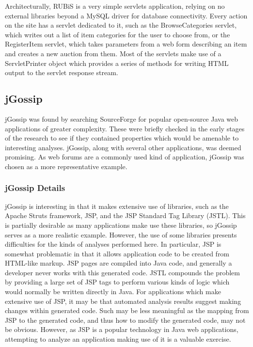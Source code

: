 \documentclass[msc,oneside]{ubcthesis}
\begin{document}
Architecturally, RUBiS is a very simple servlets application, relying on no external libraries beyond a MySQL driver for database connectivity. Every action on the site has a servlet dedicated to it, such as the BrowseCategories servlet, which writes out a list of item categories for the user to choose from, or the RegisterItem servlet, which takes parameters from a web form describing an item and creates a new auction from them. Most of the servlets make use of a ServletPrinter object which provides a series of methods for writing HTML output to the servlet response stream.

\subsection{jGossip}
jGossip was found by searching SourceForge for popular open-source Java web applications of greater complexity. These were briefly checked in the early stages of the research to see if they contained properties which would be amenable to interesting analyses. jGossip, along with several other applications, was deemed promising. As web forums are a commonly used kind of application, jGossip was chosen as a more representative example.

\subsubsection{jGossip Details}
jGossip is interesting in that it makes extensive use of libraries, such as the Apache Struts framework, JSP, and the JSP Standard Tag Library (JSTL). This is partially desirable as many applications make use these libraries, so jGossip serves as a more realistic example. However, the use of some libraries presents difficulties for the kinds of analyses performed here. In particular, JSP is somewhat problematic in that it allows application code to be created from HTML-like markup. JSP pages are compiled into Java code, and generally a developer never works with this generated code. JSTL compounds the problem by providing a large set of JSP tags to perform various kinds of logic which would normally be written directly in Java. For applications which make extensive use of JSP, it may be that automated analysis results suggest making changes within generated code. Such may be less meaningful as the mapping from JSP to the generated code, and thus how to modify the generated code, may not be obvious. However, as JSP is a popular technology in Java web applications, attempting to analyze an application making use of it is a valuable exercise.\\
\end{document}
